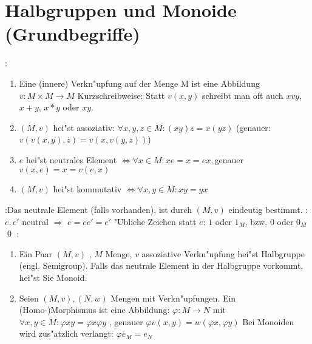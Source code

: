 \section{Halbgruppen und Monoide (Grundbegriffe)}
:{
  \begin{enumerate}
    \item Eine (innere) Verkn"upfung auf der Menge M ist eine Abbildung $v: M\times M\to M$
	  Kurzschreibweise: Statt $v(x,y)$ schreibt man oft auch $xvy$, $x+y$, $x*y$ oder $xy$.
	\item $(M,v)$ hei"st assoziativ: $\forall x,y,z\in M: (xy)z=x(yz)$
	  (genauer: $v(v(x,y),z)=v(x,v(y,z))$)
	\item $e$ hei"st neutrales Element $\Longleftrightarrow \forall x\in M: xe=x=ex, $genauer$ v(x,e)=x=v(e,x)$
	\item $(M,v)$ hei"st kommutativ $\Longleftrightarrow \forall x,y\in M: xy=yx$
  \end{enumerate}}
\remark:{Das neutrale Element (falls vorhanden), ist durch $(M,v)$ eindeutig bestimmt.}
\proof:{$e,e'$ neutral $\Rightarrow$ $e=ee'=e'$
  "Ubliche Zeichen statt $e$: $1$ oder $1_M$, bzw. $0$ oder $0_M$\qed}
:{
  \begin{enumerate}
    \item Ein Paar $(M,v)$ , $M$ Menge, $v$ assoziative Verkn"upfung hei"st Halbgruppe (engl. Semigroup).
	  Falls das neutrale Element in der Halbgruppe vorkommt, hei"st Sie Monoid.
	\item Seien $(M,v), (N,w)$ Mengen mit Verkn"upfungen. Ein (Homo-)Morphismus ist eine Abbildung:
	  $\varphi : M\to N$ mit $\forall x,y\in M: \varphi{xy}=\varphi{x}\varphi{y}$ , genauer 
	  $\varphi{v(x,y)}=w(\varphi{x},\varphi{y})$
	  Bei Monoiden wird zus"atzlich verlangt: $\varphi{e_M}=e_N$
  \end{enumerate}}
